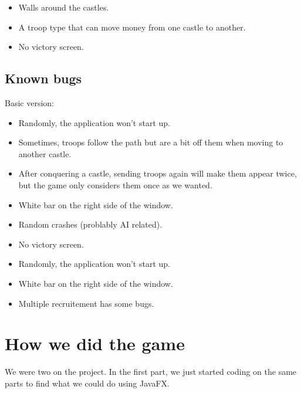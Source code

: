 \documentclass[12pt, a4paper]{report}
\begin{document}

\begin{itemize}
    \item Walls around the castles.
    \item A troop type that can move money from one castle to another.
    \item No victory screen.
\end{itemize}

\subsection*{Known bugs}

Basic version:

\begin{itemize}
    \item Randomly, the application won't start up.
    \item Sometimes, troops follow the path but are a bit off them when moving to another castle.
    \item After conquering a castle, sending troops again will make them appear twice, but the game only considers them once as we wanted.
    \item White bar on the right side of the window.
    \item Random crashes (problably AI related).
    \item No victory screen.
\end{itemize}


\begin{itemize}
    \item Randomly, the application won't start up.
    \item White bar on the right side of the window.
    \item Multiple recruitement has some bugs.
\end{itemize}

\section*{How we did the game}

We were two on the project. In the first part, we just started coding on the same parts to find what we could do using JavaFX.
\end{document}
